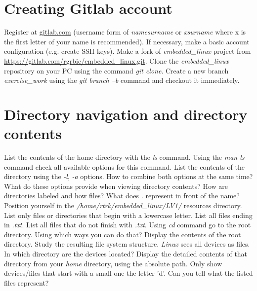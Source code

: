 \documentclass[11pt]{article}
\begin{document}
\section{Creating Gitlab account}
Register at \url{gitlab.com} (username form of \textit{namesurname} or
 \textit{xsurname} where {x} is the first letter of your name is recommended).
 If necessary, make a basic account configuration (e.g. create SSH keys). Make
 a fork of \textit{embedded\_linux} project from
 \url{https://gitlab.com/rgrbic/embedded\_linux.git}.
\newline
\newline
Clone the \textit{embedded\_linux} repository on your PC using the command
 \textit{git clone}. Create a new branch \textit{exercise\_work} using the
 \textit{git branch –b} command and checkout it immediately.

\section{Directory navigation and directory contents}
List the contents of the home directory with the \textit{ls} command. Using
 the \textit{man ls} command check all available options for this command. List
 the contents of the directory using the \textit{-l}, \textit{-a} options.
 How to combine both options at the same time? What do these options provide
 when viewing directory contents? How are directories labeled
 and how files? What does \textit{.} represent in front of the name?
 \newline
 \newline
Position yourself in the \textit{/home/rtrk/embedded\_linux/LV1/} resources
 directory. List only files or directories that begin with a lowercase letter.
 List all files ending in \textit{.txt}. List all files that do not finish
 with \textit{.txt}.
\newline
\newline
Using \textit{cd} command go to the root directory. Using which ways you can do
 that? Display the contents of the root directory. Study the resulting file
 system structure.
\newline
\newline
\textit{Linux} sees all devices as files. In which directory are the devices
 located? Display the detailed contents of that directory from your
 \textit{home} directory, using the absolute path. Only show devices/files that
 start with a small one the letter 'd'. Can you tell what the listed files
 represent?
\end{document}

